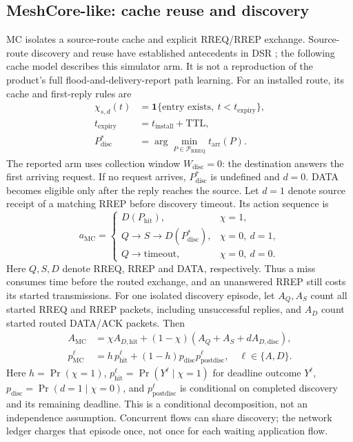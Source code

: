 \documentclass[conference,letterpaper,10pt]{IEEEtran}
\begin{document}
\subsection{MeshCore-like: cache reuse and discovery}
MC isolates a source-route cache and explicit RREQ/RREP exchange.
Source-route discovery and reuse have established antecedents in DSR
\cite{johnson1996dsr}; the following cache model describes this simulator arm.
It is not a reproduction of the product's full flood-and-delivery-report
path learning. For an installed route, its cache and first-reply rules are
\begin{equation}
\begin{aligned}
\chi_{s,d}(t)&=\mathbf 1\{\text{entry exists},\ t<t_{\mathrm{expiry}}\},\\
t_{\mathrm{expiry}}&=t_{\mathrm{install}}+\mathrm{TTL},\\
P_{\mathrm{disc}}^*&=\arg\min_{P\in\mathcal P_{\mathrm{RREQ}}}
 t_{\mathrm{arr}}(P).
\end{aligned}
\label{eq:meshcore-cache}
\end{equation}
The reported arm uses collection window $W_{\mathrm{disc}}=0$:
the destination answers the first arriving request. If no request arrives,
$P_{\mathrm{disc}}^*$ is undefined and $d=0$. DATA becomes eligible
only after the reply reaches the source. Let $d=1$ denote source receipt of
a matching RREP before discovery timeout. Its action sequence is
\begin{equation}
a_{\mathrm{MC}}=
\begin{cases}
D(P_{\mathrm{hit}}),&\chi=1,\\
Q\to S\to D(P_{\mathrm{disc}}^*),
 &\chi=0,\ d=1,\\
Q\to\mathrm{timeout},&\chi=0,\ d=0.
\end{cases}
\label{eq:meshcore-mixture}
\end{equation}
Here $Q,S,D$ denote RREQ, RREP and DATA, respectively.
Thus a miss consumes time before the routed exchange, and an unanswered
RREP still costs its started transmissions. For one isolated discovery
episode, let $A_Q,A_S$ count all started RREQ and RREP packets, including
unsuccessful replies, and $A_D$ count started routed DATA/ACK packets. Then
\begin{equation}
\begin{aligned}
A_{\mathrm{MC}}&=\chi A_{D,\mathrm{hit}}+
 (1-\chi)(A_Q+A_S+dA_{D,\mathrm{disc}}),\\
p_{\mathrm{MC}}^\ell
 &=h\,p_{\mathrm{hit}}^\ell+
   (1-h)p_{\mathrm{disc}}p_{\mathrm{postdisc}}^\ell,
 \quad \ell\in\{A,D\}.
\end{aligned}
\label{eq:meshcore-cost}
\end{equation}
Here $h=\Pr(\chi=1)$, $p_{\mathrm{hit}}^\ell=\Pr(Y^\ell\mid\chi=1)$
for deadline outcome $Y^\ell$, $p_{\mathrm{disc}}=\Pr(d=1\mid\chi=0)$, and
$p_{\mathrm{postdisc}}^\ell$ is conditional on completed discovery and its
remaining deadline. This is a conditional decomposition, not an independence
assumption. Concurrent flows can share discovery; the network ledger charges
that episode once, not once for each waiting application flow.
\end{document}
